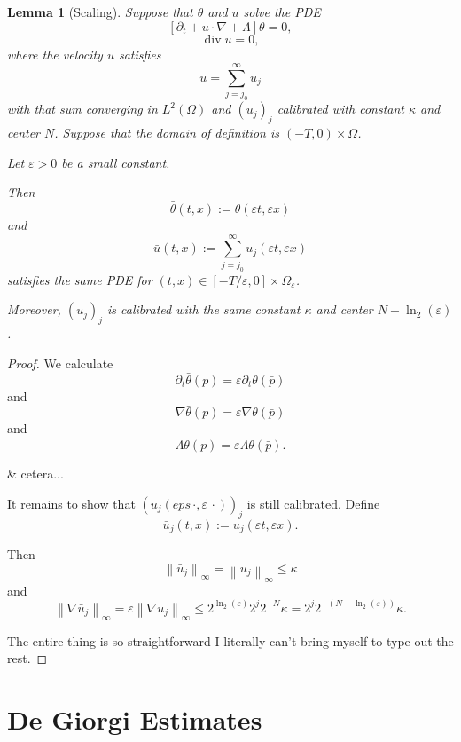 \documentclass[11pt]{amsart}
\newtheorem{lemma}[theorem]{Lemma}
\theoremstyle{remark}
\theoremstyle{definition}
\newcommand{\eps}{\varepsilon}
\newcommand{\norm}[1]{\left\lVert#1\right\rVert}
\newcommand{\bracket}[1]{\left[ #1 \right]}
\newcommand{\del}{\partial}
\newcommand{\grad}{\nabla}
\renewcommand{\div}{\operatorname{div}}
\begin{document}
\begin{lemma}[Scaling] \label{thm:scaling}
Suppose that $\theta$ and $u$ solve the PDE
\[ \bracket{\del_t + u\cdot\grad + \Lambda} \theta = 0,\]
\[ \div u = 0, \]
where the velocity $u$ satisfies
\[ u = \sum_{j=j_0}^\infty u_j \]
with that sum converging in $L^2(\Omega)$ and $(u_j)_j$ calibrated with constant $\kappa$ and center $N$.  Suppose that the domain of definition is $(-T,0) \times \Omega$.  

Let $\eps>0$ be a small constant. 

Then
\[ \bar{\theta}(t,x) := \theta(\eps t, \eps x) \]
and
\[ \bar{u}(t,x) := \sum_{j=j_0}^\infty u_j(\eps t, \eps x) \]
satisfies the same PDE for $(t,x) \in [-T/\eps, 0]\times \Omega_\eps$.  

Moreover, $(u_j)_j$ is calibrated with the same constant $\kappa$ and center $N - \ln_2(\eps)$.  

\end{lemma}

\begin{proof}
We calculate
\[ \del_t \bar{\theta}(p) = \eps \del_t \theta(\bar{p}) \]
and 
\[ \grad \bar{\theta}(p) = \eps \grad \theta(\bar{p}) \]
and
\[ \Lambda \bar{\theta}(p) = \eps \Lambda \theta(\bar{p}). \]

\& cetera...

It remains to show that $(u_j(eps\,\cdot, \eps\,\cdot))_j$ is still calibrated.  Define
\[ \bar{u}_j(t,x) := u_j(\eps t, \eps x). \]

Then
\[ \norm{\bar{u}_j}_\infty = \norm{u_j}_\infty \leq \kappa \]
and
\[ \norm{\grad \bar{u}_j}_\infty = \eps \norm{\grad u_j}_\infty \leq 2^{\ln_2(\eps)} 2^j 2^{-N} \kappa = 2^j 2^{-(N-\ln_2(\eps))} \kappa. \]

The entire thing is so straightforward I literally can't bring myself to type out the rest.  

\end{proof}




\section{De Giorgi Estimates} \label{sec:de giorgi}
\end{document}
